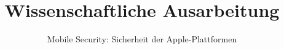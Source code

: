 \documentclass{hsflensburg}
\title{Wissenschaftliche Ausarbeitung}
\subtitle{Mobile Security: Sicherheit der Apple-Plattformen}
\author{
	\name{Florian Hansen}\\
	\institution{Hochschule Flensburg}
	\and
	\name{Michael Frank}\\
	\institution{Hochschule Flensburg}
}
\begin{document}
	\maketitle
  
  \tableofcontents

  \pagebreak
	

	\clearpage
	
	
\end{document}
